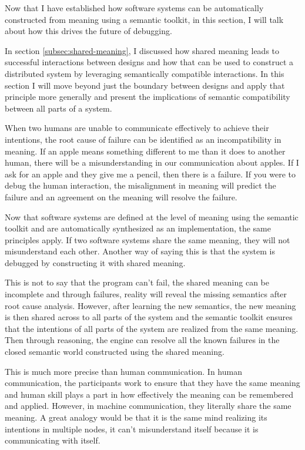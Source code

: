 Now that I have established how software systems can be automatically constructed from meaning using a semantic toolkit, in this section, I will talk about how this drives the future of debugging. 

In section \ref{subsec:shared-meaning}, I discussed how shared meaning leads to successful interactions between designs and how that can be used to construct a distributed system by leveraging semantically compatible interactions. In this section I will move beyond just the boundary between designs and apply that principle more generally and present the implications of semantic compatibility between all parts of a system.

When two humans are unable to communicate effectively to achieve their intentions, the root cause of failure can be identified as an incompatibility in meaning. If an apple means something different to me than it does to another human, there will be a misunderstanding in our communication about apples. If I ask for an apple and they give me a pencil, then there is a failure. If you were to debug the human interaction, the misalignment in meaning will predict the failure and an agreement on the meaning will resolve the failure.

Now that software systems are defined at the level of meaning using the semantic toolkit and are automatically synthesized as an implementation, the same principles apply. If two software systems share the same meaning, they will not misunderstand each other. Another way of saying this is that the system is debugged by constructing it with shared meaning. 

This is not to say that the program can't fail, the shared meaning can be incomplete and through failures, reality will reveal the missing semantics after root cause analysis. However, after learning the new semantics, the new meaning is then shared across to all parts of the system and the semantic toolkit ensures that the intentions of all parts of the system are realized from the same meaning. Then through reasoning, the engine can resolve all the known failures in the closed semantic world constructed using the shared meaning.

This is much more precise than human communication. In human communication, the participants work to ensure that they have the same meaning and human skill plays a part in how effectively the meaning can be remembered and applied. However, in machine communication, they literally share the same meaning. A great analogy would be that it is the same mind realizing its intentions in multiple nodes, it can't misunderstand itself because it is communicating with itself. 

